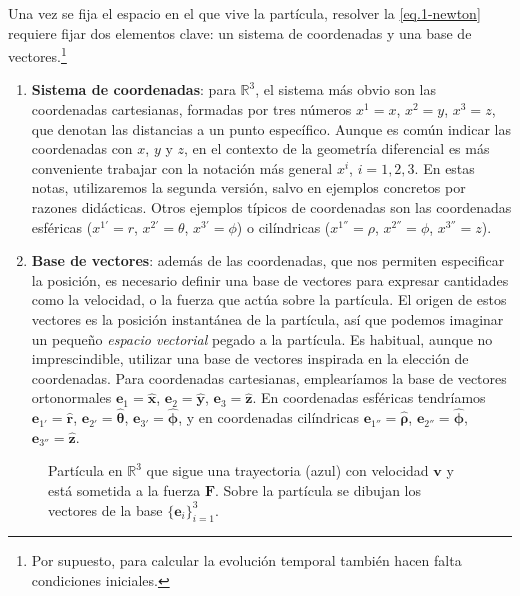 Una vez se fija el espacio en el que vive la partícula, resolver la \cref{eq.1-newton} requiere fijar dos elementos clave: un sistema de coordenadas y una base de vectores.\footnote{Por supuesto, para calcular la evolución temporal también hacen falta condiciones iniciales.}
\begin{enumerate}
    \item \textbf{Sistema de coordenadas}: para \(\mathbb{R}^3\), el sistema más obvio son las coordenadas cartesianas, formadas por tres números \(x^1 = x\), \(x^2 = y\), \(x^3 = z\), que denotan las distancias a un punto específico. Aunque es común indicar las coordenadas con \(x\), \(y\) y \(z\), en el contexto de la geometría diferencial es más conveniente trabajar con la notación más general \(x^i\), \(i= 1, 2, 3\). En estas notas, utilizaremos la segunda versión, salvo en ejemplos concretos por razones didácticas. Otros ejemplos típicos de coordenadas son las coordenadas esféricas (\(x^{1'}=r\), \(x^{2'}=\theta\), \(x^{3'}=\phi\)) o cilíndricas (\(x^{1''}=\rho\), \(x^{2''}=\phi\), \(x^{3''}=z\)). 
    
    \item \textbf{Base de vectores}: además de las coordenadas, que nos permiten especificar la posición, es necesario definir una base de vectores para expresar cantidades como la velocidad, o la fuerza que actúa sobre la partícula. El origen de estos vectores es la posición instantánea de la partícula, así que podemos imaginar un pequeño \textit{espacio vectorial} pegado a la partícula. Es habitual, aunque no imprescindible, utilizar una base de vectores inspirada en la elección de coordenadas. Para coordenadas cartesianas, emplearíamos la base de vectores ortonormales \(\mathbf{e}_1 = \hat{\mathbf{x}}\), \(\mathbf{e}_2 = \hat{\mathbf{y}}\), \(\mathbf{e}_3 = \hat{\mathbf{z}}\). En coordenadas esféricas tendríamos \(\mathbf{e}_{1'} = \hat{\mathbf{r}}\), \(\mathbf{e}_{2'} = \hat{\boldsymbol{\theta}}\), \(\mathbf{e}_{3'} = \hat{\boldsymbol{\phi}}\), y en coordenadas cilíndricas \(\mathbf{e}_{1''} = \hat{\boldsymbol{\rho}}\), \(\mathbf{e}_{2''} = \hat{\boldsymbol{\phi}}\), \(\mathbf{e}_{3''} = \hat{\mathbf{z}}\).      
\end{enumerate}

\begin{figure}[htbp]
    \centering
    
    \caption{Partícula en \(\mathbb{R}^3\) que sigue una trayectoria (azul) con velocidad \(\mathbf{v}\) y está sometida a la fuerza \(\mathbf{F}\). Sobre la partícula se dibujan los vectores de la base \(\{\mathbf{e}_i\}_{i=1}^3\).}
    \label{fig.1-espacio_base_R3}
\end{figure}

